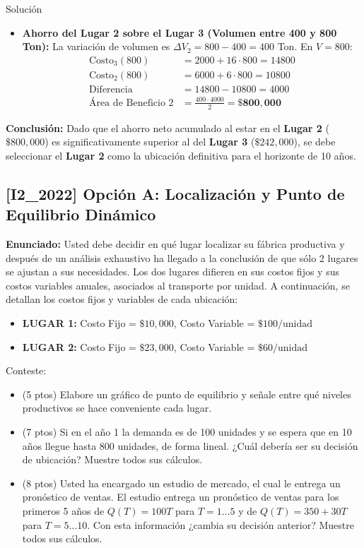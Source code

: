 \documentclass[11pt, a4paper]{article}
\begin{document}
\begin{ejercicio}{Solución}
\begin{itemize}
    \item \textbf{Ahorro del Lugar 2 sobre el Lugar 3 (Volumen entre 400 y 800 Ton):}
    La variación de volumen es $\Delta V_2 = 800 - 400 = 400$ Ton.
    En $V=800$:
    \begin{align*}
      \text{Costo}_3(800) &= 2000 + 16 \cdot 800 = 14800 \\
      \text{Costo}_2(800) &= 6000 + 6 \cdot 800 = 10800 \\
      \text{Diferencia} &= 14800 - 10800 = 4000 \\
      \text{Área de Beneficio 2} &= \frac{400 \cdot 4000}{2} = \mathbf{\$800,000}
    \end{align*}
  \end{itemize}

  \textbf{Conclusión:} Dado que el ahorro neto acumulado al estar en el \textbf{Lugar 2} ($\$800,000$) es significativamente superior al del \textbf{Lugar 3} ($\$242,000$), se debe seleccionar el \textbf{Lugar 2} como la ubicación definitiva para el horizonte de 10 años.

\end{ejercicio}

\newpage

\subsection*{[I2_2022] Opción A: Localización y Punto de Equilibrio Dinámico}
\textbf{Enunciado:}
  Usted debe decidir en qué lugar localizar su fábrica productiva y después de un análisis exhaustivo ha llegado a la conclusión de que sólo 2 lugares se ajustan a sus necesidades. Los dos lugares difieren en sus costos fijos y sus costos variables anuales, asociados al transporte por unidad. A continuación, se detallan los costos fijos y variables de cada ubicación:
  \begin{itemize}
    \item \textbf{LUGAR 1:} Costo Fijo = $\$10,000$, Costo Variable = $\$100/\text{unidad}$
    \item \textbf{LUGAR 2:} Costo Fijo = $\$23,000$, Costo Variable = $\$60/\text{unidad}$
  \end{itemize}

  Conteste:
  \begin{itemize}
    \item[\textbf{i.}] (5 ptos) Elabore un gráfico de punto de equilibrio y señale entre qué niveles productivos se hace conveniente cada lugar.
    \item[\textbf{ii.}] (7 ptos) Si en el año 1 la demanda es de 100 unidades y se espera que en 10 años llegue hasta 800 unidades, de forma lineal. ¿Cuál debería ser su decisión de ubicación? Muestre todos sus cálculos.
    \item[\textbf{iii.}] (8 ptos) Usted ha encargado un estudio de mercado, el cual le entrega un pronóstico de ventas. El estudio entrega un pronóstico de ventas para los primeros 5 años de $Q(T) = 100T$ para $T=1 \dots 5$ y de $Q(T) = 350 + 30T$ para $T=5 \dots 10$. Con esta información ¿cambia su decisión anterior? Muestre todos sus cálculos.
  \end{itemize}
\end{document}

